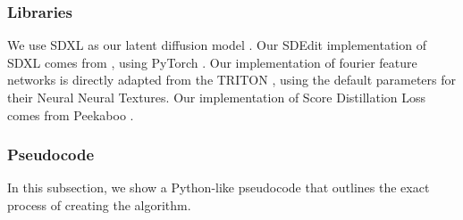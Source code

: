 \subsubsection{Libraries}
We use SDXL as our latent diffusion model \cite{podell2023sdxl}. Our SDEdit implementation of SDXL comes from \cite{diffusers}, using PyTorch \cite{paszke2019pytorch}. Our implementation of fourier feature networks is directly adapted from the TRITON \cite{Burgert2022}, using the default parameters for their Neural Neural Textures. Our implementation of Score Distillation Loss comes from Peekaboo \cite{Burgert2022PeekabooTT}.

\subsubsection{Pseudocode}
\label{diffill_sec:pseudocode}
In this subsection, we show a Python-like pseudocode that outlines the exact process of creating the algorithm.

